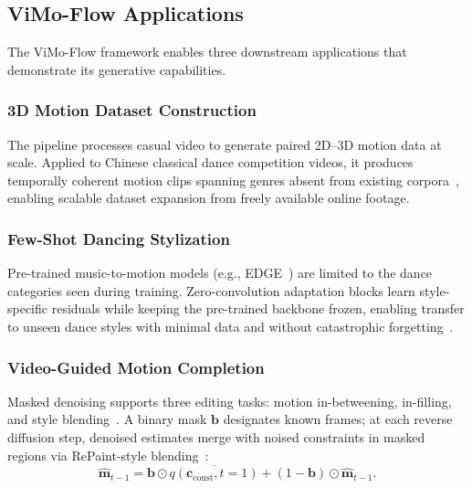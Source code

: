 \subsection{ViMo-Flow Applications}
\label{sec:applications}

The ViMo-Flow framework enables three downstream applications that demonstrate its generative capabilities.

\subsubsection{3D Motion Dataset Construction}
The pipeline processes casual video to generate paired 2D--3D motion data at scale. Applied to Chinese classical dance competition videos, it produces temporally coherent motion clips spanning genres absent from existing corpora~\cite{h3wb2014, amass2019, act2mo2020}, enabling scalable dataset expansion from freely available online footage.

\subsubsection{Few-Shot Dancing Stylization}
Pre-trained music-to-motion models (e.g., EDGE~\cite{edge2023}) are limited to the dance categories seen during training. Zero-convolution adaptation blocks learn style-specific residuals while keeping the pre-trained backbone frozen, enabling transfer to unseen dance styles with minimal data and without catastrophic forgetting~\cite{edge2023}.

\subsubsection{Video-Guided Motion Completion}
Masked denoising supports three editing tasks: motion in-betweening, in-filling, and style blending~\cite{singshot2021, robmo2020}. A binary mask $\mathbf{b}$ designates known frames; at each reverse diffusion step, denoised estimates merge with noised constraints in masked regions via RePaint-style blending~\cite{repaint2022}:
\[
    \hat{\mathbf{m}}_{t-1} = \mathbf{b}\odot\overline{q(\mathbf{c}_{\text{const}},t=1)} + (1-\mathbf{b})\odot\hat{\mathbf{m}}_{t-1}.
\]
